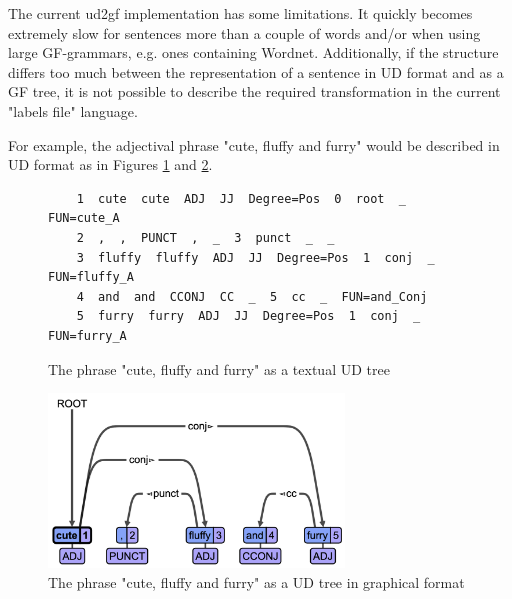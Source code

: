 \documentclass{article}
\begin{document}
The current ud2gf implementation has some limitations. It quickly becomes extremely slow for sentences more than a couple of words and/or 
when using large GF-grammars, e.g. ones containing Wordnet\cite{angelov2016predicting}. Additionally, if the structure differs too much between the representation of a sentence in UD format and as a GF tree, it is not possible to describe the required transformation in the current "labels file" language. 

For example, the adjectival phrase "cute, fluffy and furry"
would be described in UD format as in Figures \ref{fig:ud_cute_text} and \ref{fig:ud_cute}.


\begin{figure}
    \begin{verbatim}
    1  cute  cute  ADJ  JJ  Degree=Pos  0  root  _  FUN=cute_A
    2  ,  ,  PUNCT  ,  _  3  punct  _  _
    3  fluffy  fluffy  ADJ  JJ  Degree=Pos  1  conj  _  FUN=fluffy_A
    4  and  and  CCONJ  CC  _  5  cc  _  FUN=and_Conj
    5  furry  furry  ADJ  JJ  Degree=Pos  1  conj  _  FUN=furry_A
    \end{verbatim}
    \caption{The phrase "cute, fluffy and furry" as a textual UD tree}
    \label{fig:ud_cute_text}
\end{figure}

\begin{figure}
    \centering
    \includegraphics[width=0.7\textwidth]{ud_cute.png}
    \caption{The phrase "cute, fluffy and furry" as a UD tree in graphical format}
    \label{fig:ud_cute}
\end{figure}
% 
\end{document}
